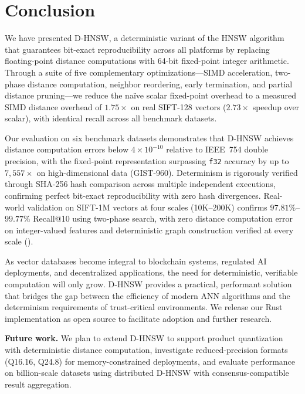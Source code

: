 \documentclass[10pt,journal]{IEEEtran}
\newcommand{\dhnsw}{\textsc{D-HNSW}}
\newcommand{\hnsw}{\textsc{HNSW}}
\begin{document}
\section{Conclusion}
\label{sec:conclusion}

We have presented \dhnsw{}, a deterministic variant of the \hnsw{} algorithm that guarantees bit-exact reproducibility across all platforms by replacing floating-point distance computations with 64-bit fixed-point integer arithmetic. Through a suite of five complementary optimizations---SIMD acceleration, two-phase distance computation, neighbor reordering, early termination, and partial distance pruning---we reduce the na\"ive scalar fixed-point overhead to a measured SIMD distance overhead of $1.75\times$ on real SIFT-128 vectors ($2.73\times$ speedup over scalar), with identical recall across all benchmark datasets.

Our evaluation on six benchmark datasets demonstrates that \dhnsw{} achieves distance computation errors below $4 \times 10^{-10}$ relative to IEEE~754 double precision, with the fixed-point representation surpassing \texttt{f32} accuracy by up to $7{,}557\times$ on high-dimensional data (GIST-960). Determinism is rigorously verified through SHA-256 hash comparison across multiple independent executions, confirming perfect bit-exact reproducibility with zero hash divergences. Real-world validation on SIFT-1M vectors at four scales (10K--200K) confirms $97.81\%$--$99.77\%$ Recall@10 using two-phase search, with zero distance computation error on integer-valued features and deterministic graph construction verified at every scale ().

As vector databases become integral to blockchain systems, regulated AI deployments, and decentralized applications, the need for deterministic, verifiable computation will only grow. \dhnsw{} provides a practical, performant solution that bridges the gap between the efficiency of modern ANN algorithms and the determinism requirements of trust-critical environments. We release our Rust implementation as open source to facilitate adoption and further research.

\textbf{Future work.} We plan to extend \dhnsw{} to support product quantization with deterministic distance computation, investigate reduced-precision formats (Q16.16, Q24.8) for memory-constrained deployments, and evaluate performance on billion-scale datasets using distributed \dhnsw{} with consensus-compatible result aggregation.
\end{document}
